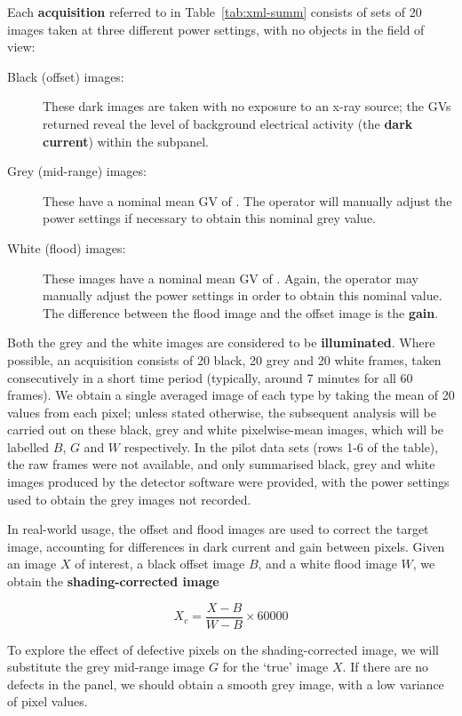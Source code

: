 \documentclass[\main/IO-Pixels.tex]{subfiles}
\begin{document}
Each \textbf{acquisition} referred to in Table~\ref{tab:xml-summ} consists of sets of 20 images taken at three different power settings, with no objects in the field of view:
\begin{description}

\item[Black (offset) images:] These dark images are taken with no exposure to an x-ray source; the GVs returned reveal the level of background electrical activity (the \textbf{dark current}) within the subpanel.
\item[Grey (mid-range) images:] These have a nominal mean GV of . The operator will manually adjust the power settings if necessary to obtain this nominal grey value.
\item[White (flood) images:] These images have a nominal mean GV of . Again, the operator may manually adjust the power settings in order to obtain this nominal value. The difference between the flood image and the offset image is the \textbf{gain}.
\end{description}

Both the grey and the white images are considered to be \textbf{illuminated}. Where possible, an acquisition consists of 20 black, 20 grey and 20 white frames, taken consecutively in a short time period (typically, around 7 minutes for all 60 frames). We obtain a single averaged image of each type by taking the mean of 20 values from each pixel; unless stated otherwise, the subsequent analysis will be carried out on these black, grey and white pixelwise-mean images, which will be labelled $B$, $G$ and $W$ respectively. In the pilot data sets (rows 1-6 of the table), the raw frames were not available, and only summarised black, grey and white images produced by the detector software were provided, with the power settings used to obtain the grey images not recorded.

In real-world usage, the offset and flood images are used to correct the target image, accounting for differences in dark current and gain between pixels. Given an image $X$ of interest, a black offset image $B$, and a white flood image $W$, we obtain the \textbf{shading-corrected image}

\begin{equation}
\label{eq:shading-correction}
	X_c = \frac{X -B}{W - B} \times 60000
\end{equation}

To explore the effect of defective pixels on the shading-corrected image, we will substitute the grey mid-range image $G$ for the `true' image $X$. If there are no defects in the panel, we should obtain a smooth grey image, with a low variance of pixel values. 
\end{document}

